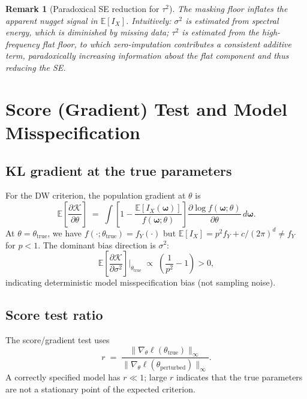 \documentclass[12pt]{article}
\newtheorem{remark}{Remark}
\begin{document}
\begin{remark}[Paradoxical SE reduction for $\tau^2$]
The masking floor inflates the apparent nugget signal in $\mathbb{E}[I_X]$.
Intuitively: $\sigma^2$ is estimated from spectral energy, which is
diminished by missing data; $\tau^2$ is estimated from the high-frequency
flat floor, to which zero-imputation contributes a consistent additive
term, paradoxically \emph{increasing} information about the flat component
and thus reducing the SE.
\end{remark}


\section{Score (Gradient) Test and Model Misspecification}
\label{sec:score}

\subsection{KL gradient at the true parameters}

For the DW criterion, the population gradient at $\theta$ is
\[
  \mathbb{E}\!\left[\frac{\partial \mathcal{K}}{\partial \theta}\right]
  \;=\; \int
        \left[
          1 - \frac{\mathbb{E}[I_X(\boldsymbol{\omega})]}
                   {f(\boldsymbol{\omega};\theta)}
        \right]
        \frac{\partial \log f(\boldsymbol{\omega};\theta)}{\partial \theta}
        \,d\boldsymbol{\omega}.
\]
At $\theta = \theta_{\mathrm{true}}$, we have $f(\cdot;\theta_{\mathrm{true}}) = f_Y(\cdot)$
but $\mathbb{E}[I_X] = p^2 f_Y + c/(2\pi)^d \neq f_Y$ for $p < 1$.
The dominant bias direction is $\sigma^2$:
\begin{equation}
  \mathbb{E}\!\left[\frac{\partial \mathcal{K}}{\partial \sigma^2}\right]
  \bigg|_{\theta_{\mathrm{true}}}
  \;\propto\; \left(\frac{1}{p^2} - 1\right) > 0,
  \label{eq:sigma_gradient}
\end{equation}
indicating deterministic model misspecification bias (not sampling noise).

\subsection{Score test ratio}

The score/gradient test uses
\[
  r \;=\; \frac{\|\nabla_\theta\ell(\theta_{\mathrm{true}})\|_\infty}
               {\|\nabla_\theta\ell(\theta_{\mathrm{perturbed}})\|_\infty}.
\]
A correctly specified model has $r \ll 1$; large $r$ indicates that
the true parameters are not a stationary point of the expected criterion.
\end{document}
